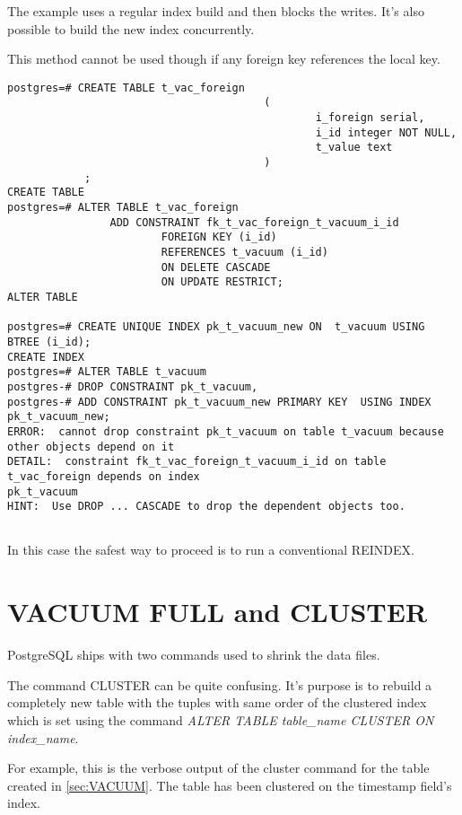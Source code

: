 The example uses a regular index build and then blocks the writes. It's also possible to 
build the new index concurrently.

This method cannot be used though if any foreign key references the local key.

\begin{lstlisting}[style=pgsql]
 postgres=# CREATE TABLE t_vac_foreign
                                        (
                                                i_foreign serial,
                                                i_id integer NOT NULL,
                                                t_value text
                                        )
            ;
CREATE TABLE
postgres=# ALTER TABLE t_vac_foreign 
                ADD CONSTRAINT fk_t_vac_foreign_t_vacuum_i_id
                        FOREIGN KEY (i_id) 
                        REFERENCES t_vacuum (i_id) 
                        ON DELETE CASCADE 
                        ON UPDATE RESTRICT;
ALTER TABLE

postgres=# CREATE UNIQUE INDEX pk_t_vacuum_new ON  t_vacuum USING BTREE (i_id);
CREATE INDEX
postgres=# ALTER TABLE t_vacuum
postgres-# DROP CONSTRAINT pk_t_vacuum,
postgres-# ADD CONSTRAINT pk_t_vacuum_new PRIMARY KEY  USING INDEX pk_t_vacuum_new;
ERROR:  cannot drop constraint pk_t_vacuum on table t_vacuum because other objects depend on it
DETAIL:  constraint fk_t_vac_foreign_t_vacuum_i_id on table t_vac_foreign depends on index 
pk_t_vacuum
HINT:  Use DROP ... CASCADE to drop the dependent objects too.


\end{lstlisting}

In this case the safest way to proceed is to run a conventional REINDEX. 


\section{VACUUM FULL and CLUSTER}
\label{sec:VACFULL}
PostgreSQL ships with two commands used to shrink the data files.\newline

The command CLUSTER can be quite confusing. It's purpose is to rebuild a completely new table with 
the tuples with same order of the clustered index which is set using  the  command 
\textit{ALTER TABLE table\_name CLUSTER ON index\_name}.\newline

For example, this is the verbose output of the cluster command for the table created in \ref{sec:VACUUM}.
The table has been clustered on the timestamp field's index.

